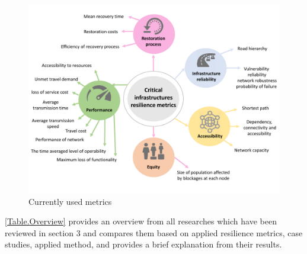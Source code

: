 \documentclass[11pt,twoside]{article}
\numberwithin{equation}{section}
\newcommand{\?}{\stackrel{?}{=}}
\begin{document}
\begin{figure}[h!]
  \centering
  \includegraphics[scale=0.6]{Pic1}
  \caption{Currently used metrics}\label{metric domains}
\end{figure}

\autoref{Table.Overview} provides an overview from all researches which have been reviewed in section 3 and compares them based on applied resilience metrics, case studies, applied method, and provides a brief explanation from their results.\\
\end{document}
